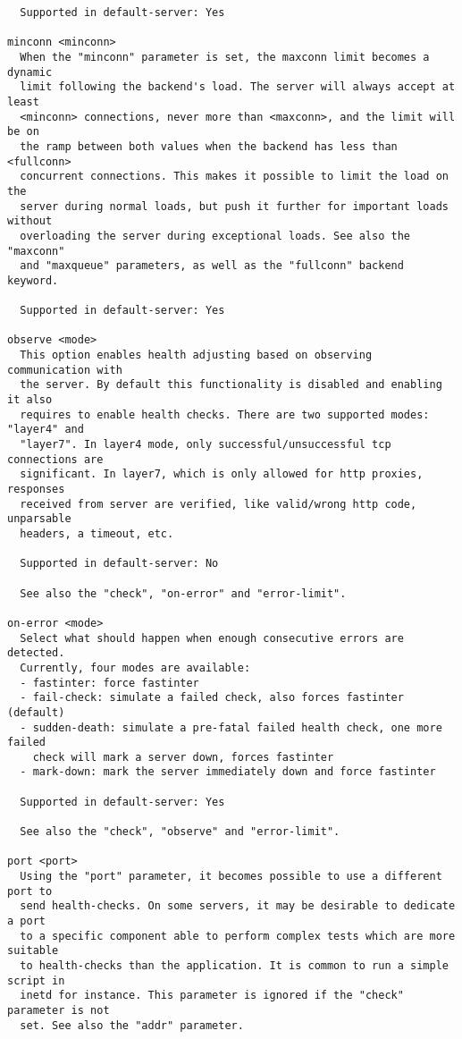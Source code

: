 \begin{verbatim}
  Supported in default-server: Yes

minconn <minconn>
  When the "minconn" parameter is set, the maxconn limit becomes a dynamic
  limit following the backend's load. The server will always accept at least
  <minconn> connections, never more than <maxconn>, and the limit will be on
  the ramp between both values when the backend has less than <fullconn>
  concurrent connections. This makes it possible to limit the load on the
  server during normal loads, but push it further for important loads without
  overloading the server during exceptional loads. See also the "maxconn"
  and "maxqueue" parameters, as well as the "fullconn" backend keyword.

  Supported in default-server: Yes

observe <mode>
  This option enables health adjusting based on observing communication with
  the server. By default this functionality is disabled and enabling it also
  requires to enable health checks. There are two supported modes: "layer4" and
  "layer7". In layer4 mode, only successful/unsuccessful tcp connections are
  significant. In layer7, which is only allowed for http proxies, responses
  received from server are verified, like valid/wrong http code, unparsable
  headers, a timeout, etc.

  Supported in default-server: No

  See also the "check", "on-error" and "error-limit".

on-error <mode>
  Select what should happen when enough consecutive errors are detected.
  Currently, four modes are available:
  - fastinter: force fastinter
  - fail-check: simulate a failed check, also forces fastinter (default)
  - sudden-death: simulate a pre-fatal failed health check, one more failed
    check will mark a server down, forces fastinter
  - mark-down: mark the server immediately down and force fastinter

  Supported in default-server: Yes

  See also the "check", "observe" and "error-limit".

port <port>
  Using the "port" parameter, it becomes possible to use a different port to
  send health-checks. On some servers, it may be desirable to dedicate a port
  to a specific component able to perform complex tests which are more suitable
  to health-checks than the application. It is common to run a simple script in
  inetd for instance. This parameter is ignored if the "check" parameter is not
  set. See also the "addr" parameter.


\end{verbatim}
